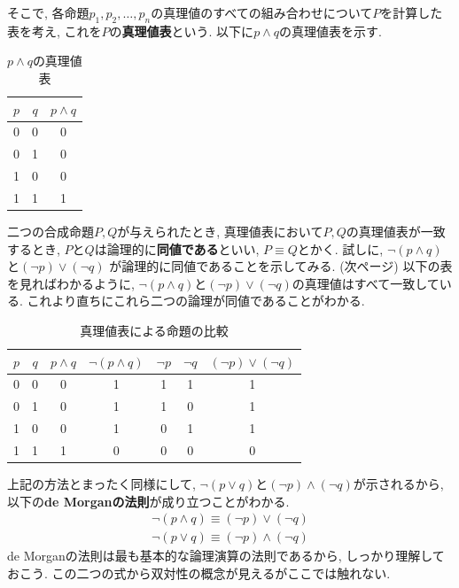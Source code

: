 \documentclass[a4j,dvipdfmx]{jsarticle}
\numberwithin{equation}{section}
\begin{document}
            そこで, 各命題$p_1,p_2,\dots,p_n$の真理値のすべての組み合わせについて$P$を計算した表を考え, これを$P$の\textbf{真理値表}という. 以下に$p\land q$の真理値表を示す.
            \begin{table}[h]
                \centering
                \begin{tabular}{cc|c}
                    $p$ & $q$ & $p\land q$ \\\hline
                    0 & 0 & 0 \\\hline
                    0 & 1 & 0 \\\hline
                    1 & 0 & 0 \\\hline
                    1 & 1 & 1 \\\hline
                \end{tabular}
                \caption{$p\land q$の真理値表}
            \end{table}

            二つの合成命題$P,Q$が与えられたとき, 真理値表において$P,Q$の真理値表が一致するとき, $P$と$Q$は論理的に\textbf{同値である}といい, $P\equiv Q$とかく. 試しに, $\lnot (p\land q)$と$(\lnot p)\lor (\lnot q)$
            が論理的に同値であることを示してみる. (次ページ)
            \clearpage
            以下の表を見ればわかるように, $\lnot (p\land q)$と$(\lnot p)\lor (\lnot q)$の真理値はすべて一致している. これより直ちにこれら二つの論理が同値であることがわかる.

            \begin{table}[h]
                \centering
                \begin{tabular}{cc||cc|ccc}
                    $p$ & $q$ & $p\land q$ & $\lnot(p\land q)$ & $\lnot p$ & $\lnot q$ & $(\lnot p)\lor(\lnot q)$ \\\hline
                    0 & 0 & 0 & 1 & 1 & 1 & 1\\
                    0 & 1 & 0 & 1 & 1 & 0 & 1\\
                    1 & 0 & 0 & 1 & 0 & 1 & 1\\
                    1 & 1 & 1 & 0 & 0 & 0 & 0\\
                \end{tabular}
                \caption{真理値表による命題の比較}
            \end{table}

            上記の方法とまったく同様にして, $\lnot (p\lor q)$と$(\lnot p)\land (\lnot q)$が示されるから, 以下の\textbf{de Morganの法則}が成り立つことがわかる.
            \begin{align}
                \lnot (p\land q) \equiv (\lnot p) \lor (\lnot q) \label{eq:集合論基礎:論理ドモルガン1}\\
                \lnot (p\lor q) \equiv (\lnot p) \land (\lnot q) \label{eq:集合論基礎:論理ドモルガン2}
            \end{align}
            de Morganの法則は最も基本的な論理演算の法則であるから, しっかり理解しておこう. この二つの式から双対性の概念が見えるがここでは触れない.
\end{document}
